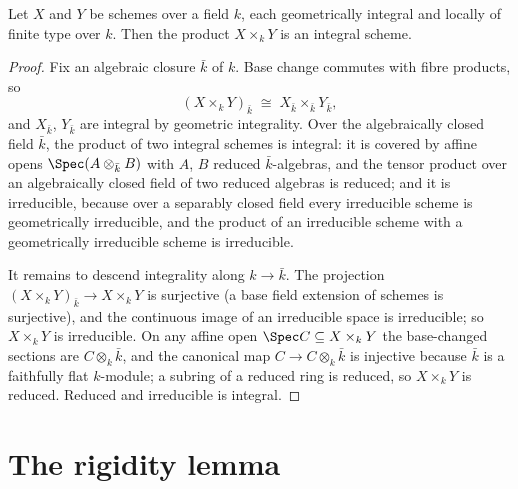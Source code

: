 \begin{lemma}
  \label{lem:product_integral}
  \leanok
  Let \(X\) and \(Y\) be schemes over a field \(k\), each geometrically integral and locally
  of finite type over \(k\). Then the product \(X \times_k Y\) is an integral scheme.
\end{lemma}
\begin{proof}
  \leanok
  Fix an algebraic closure \(\bar k\) of \(k\). Base change commutes with fibre products, so
  \[
    (X \times_k Y)_{\bar k} \;\cong\; X_{\bar k} \times_{\bar k} Y_{\bar k},
  \]
  and \(X_{\bar k}\), \(Y_{\bar k}\) are integral by geometric integrality. Over the
  algebraically closed field \(\bar k\), the product of two integral schemes is integral: it
  is covered by affine opens \(\Spec (A \otimes_{\bar k} B)\) with \(A\), \(B\) reduced
  \(\bar k\)-algebras, and the tensor product over an algebraically closed field of two
  reduced algebras is reduced; and it is irreducible, because over a separably closed field
  every irreducible scheme is geometrically irreducible, and the product of an irreducible
  scheme with a geometrically irreducible scheme is irreducible.

  It remains to descend integrality along \(k \to \bar k\). The projection
  \((X \times_k Y)_{\bar k} \to X \times_k Y\) is surjective (a base field extension of
  schemes is surjective), and the continuous image of an irreducible space is irreducible;
  so \(X \times_k Y\) is irreducible. On any affine open \(\Spec C \subseteq X \times_k Y\)
  the base-changed sections are \(C \otimes_k \bar k\), and the canonical map
  \(C \to C \otimes_k \bar k\) is injective because \(\bar k\) is a faithfully flat
  \(k\)-module; a subring of a reduced ring is reduced, so \(X \times_k Y\) is reduced.
  Reduced and irreducible is integral.
\end{proof}

\section{The rigidity lemma}

